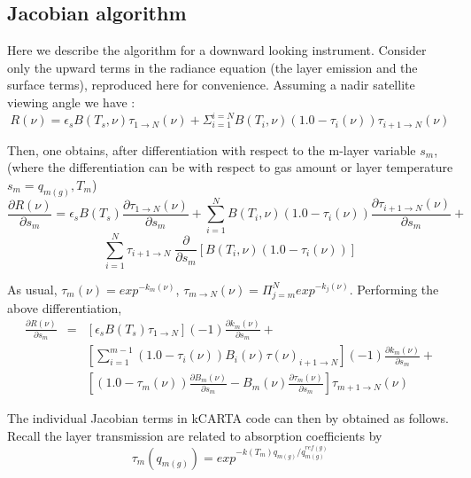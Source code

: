 \documentclass[12pt]{article}
\newcommand{\kc}{\textsf{kCARTA}\xspace}
\begin{document}
{{{{\subsection{Jacobian algorithm}

Here we describe the algorithm for a downward looking instrument.
Consider only the upward terms in the radiance equation (the layer
emission and the surface terms), reproduced here for convenience.
Assuming a nadir satellite viewing angle we have :
\begin{equation}
R(\nu) = \epsilon_{s}B(T_{s},\nu) \tau_{1 \rightarrow N}(\nu) +
\Sigma_{i=1}^{i=N} B(T_{i},\nu) (1.0 - \tau_{i}(\nu)) 
\tau_{i+1 \rightarrow N}(\nu)
\end{equation}

Then, one obtains, after differentiation with respect to the m-layer
variable $s_{m}$, (where the differentiation can be with respect to
gas amount or layer temperature $s_{m} = q_{m(g)},T_{m}$)
\[
\frac{\partial R(\nu)}{\partial s_{m}} = \epsilon_{s}B(T_{s}) 
\frac{\partial \tau_{1 \rightarrow N}(\nu)}{\partial s_{m}} +
\sum_{i=1}^{N} B(T_{i},\nu) (1.0 - \tau_{i}(\nu))
\frac{\partial \tau_{i+1 \rightarrow N}(\nu)}{\partial s_{m}} + 
\]
\begin{equation}
\sum_{i=1}^{N} \tau_{i+1 \rightarrow N} \; \frac{\partial } {\partial s_{m}}
\left[ B(T_{i},\nu)(1.0 - \tau_{i}(\nu)) \right]
\end{equation}

As usual, $\tau_{m}(\nu) = exp^{-k_{m}(\nu)}$,
$\tau_{m \rightarrow N}(\nu) = \Pi_{j=m}^{N} exp^{-k_{j}(\nu)}$. Performing the
above differentiation,  
\begin{eqnarray*}
\frac{\partial R(\nu)}{\partial s_{m}} & = &
\left[
\epsilon_{s}B(T_{s}) \tau_{1 \rightarrow N} \right]
(-1)\frac{\partial k_{m}(\nu)}{\partial s_{m}} + \\
& & \left[ \sum_{i=1}^{m-1} (1.0 - \tau_{i}(\nu)) B_{i}(\nu) 
\tau(\nu)_{i+1 \rightarrow N}
\right](-1)\frac{\partial k_{m}(\nu)}{\partial s_{m}} + \\  
& & \left[(1.0-\tau_{m}(\nu))\frac{\partial B_{m}(\nu)}{\partial s_{m}} -
B_{m}(\nu)\frac{\partial \tau_{m}(\nu)}{\partial s_{m}}
\right]\tau_{m+1 \rightarrow N}(\nu)
\end{eqnarray*}

The individual Jacobian terms in \kc code can then by obtained as follows.
Recall the layer transmission are related to absorption coefficients by
\begin{equation}
\tau_{m}(q_{m(g)}) = exp^{-k(T_{m})q_{m(g)}/q^{ref(g)}_{m(g)}}
\end{equation}

}}}}
\end{document}
